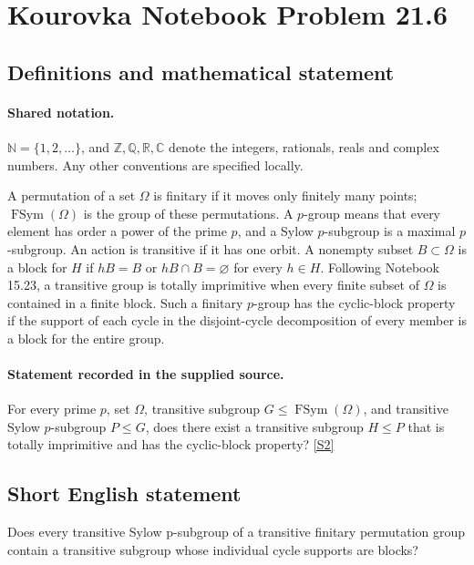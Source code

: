 \documentclass[11pt]{article}
\newcommand{\sref}[2]{\hyperlink{source:#1:#2}{[S#2]}}
\begin{document}
\section{Kourovka Notebook Problem 21.6}\label{statement}

\subsection{Definitions and mathematical statement}

\paragraph{Shared notation.}$\mathbb N=\{1,2,\ldots\}$, and $\mathbb Z,\mathbb Q,\mathbb R,\mathbb C$ denote the integers, rationals, reals and complex numbers. Any other conventions are specified locally.


A permutation of a set $\Omega$ is finitary if it moves only finitely many points; $\operatorname{FSym}(\Omega)$ is the group of these permutations. A $p$-group means that every element has order a power of the prime $p$, and a Sylow $p$-subgroup is a maximal $p$-subgroup. An action is transitive if it has one orbit. A nonempty subset $B\subset\Omega$ is a block for $H$ if $hB=B$ or $hB\cap B=\varnothing$ for every $h\in H$. Following Notebook 15.23, a transitive group is totally imprimitive when every finite subset of $\Omega$ is contained in a finite block. Such a finitary $p$-group has the cyclic-block property if the support of each cycle in the disjoint-cycle decomposition of every member is a block for the entire group.
\paragraph{Statement recorded in the supplied source.}
For every prime $p$, set $\Omega$, transitive subgroup $G\leq\operatorname{FSym}(\Omega)$, and transitive Sylow $p$-subgroup $P\leq G$, does there exist a transitive subgroup $H\leq P$ that is totally imprimitive and has the cyclic-block property? \sref{statement}{2}
\subsection{Short English statement}
Does every transitive Sylow p-subgroup of a transitive finitary permutation group contain a transitive subgroup whose individual cycle supports are blocks?
\end{document}

